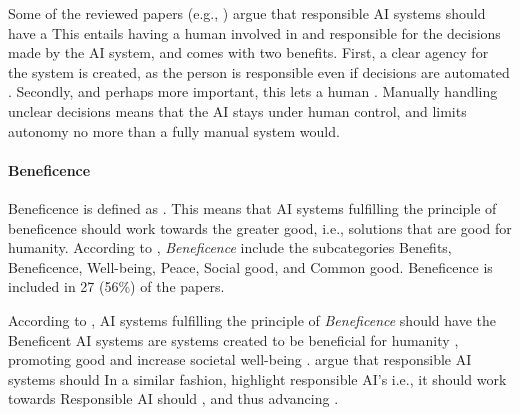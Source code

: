 Some of the reviewed papers (e.g., \cite{Brand_2022,Nevanperä_2021}) argue that responsible AI systems should have a  This entails having a human involved in and responsible for the decisions made by the AI system, and comes with two benefits. First, a clear agency for the system is created, as the person is responsible even if decisions are automated \parencite{Nevanperä_2021}. Secondly, and perhaps more important, this lets a human  \parencite[p.~12]{vanBruxvoort_2021}. Manually handling unclear decisions means that the AI stays under human control, and limits autonomy no more than a fully manual system would.


\paragraph{Beneficence}
Beneficence is defined as  \parencite{dictionary_beneficence}. This means that AI systems fulfilling the principle of beneficence should work towards the greater good, i.e., solutions that are good for humanity. According to \textcite{Ryan_2021}, \textit{Beneficence} include the subcategories Benefits, Beneficence, Well-being, Peace, Social good, and Common good. Beneficence is included in 27 (56\%) of the papers.

According to \textcite[p.~9]{vanBruxvoort_2021}, AI systems fulfilling the principle of \textit{Beneficence} should have the  Beneficent AI systems are systems created to be beneficial for humanity \parencite{Floridi_2018}, promoting good \parencite{Jobin_2019} and increase societal well-being \parencite{Mikalef_2022}. \textcite[p.~103]{BarredoArrieta_2020} argue that responsible AI systems should  In a similar fashion, \textcite[p.~2]{Buhmann_2021} highlight responsible AI's  i.e., it should work towards  Responsible AI should  \parencite[p.~419]{Clarke_2019}, and  thus advancing  \parencite[p.~97534]{Rizinski_2022}.

